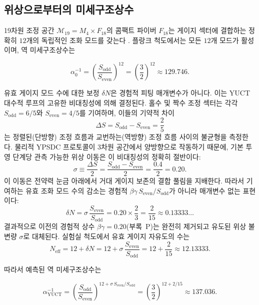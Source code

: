 \documentclass[12pt,a4paper]{article}
\theoremstyle{remark}
\begin{document}
	\subsection{위상으로부터의 미세구조상수}
	
	19차원 조정 공간 \(\mathcal{M}_{19}=M_4\times F_{18}\)의 콤팩트 파이버 \(F_{18}\)는 게이지 섹터에 결합하는 정확히 \(12\)개의 독립적인 조화 모드를 갖는다 \cite{AppendixG}. 플랑크 척도에서는 모든 \(12\)개 모드가 활성이며, 역 미세구조상수는
	
	\begin{equation}
		\alpha_0^{-1} = \left(\frac{S_{\mathrm{odd}}}{S_{\mathrm{even}}}\right)^{12}
		= \left(\frac{3}{2}\right)^{12} \approx 129.746 .
	\end{equation}
	
	유효 게이지 모드 수에 대한 보정 \(\delta N\)은 경험적 피팅 매개변수가 아니다. 이는 YUCT 대수적 루프의 고유한 비대칭성에 의해 결정된다. 홀수 및 짝수 조정 섹터는 각각 \(S_{\mathrm{odd}} = 6/5\)와 \(S_{\mathrm{even}} = 4/5\)를 기여하며, 이들의 기약적 차이
	\[
	\Delta S = S_{\mathrm{odd}} - S_{\mathrm{even}} = \frac{2}{5}
	\]
	는 정렬된(단방향) 조정 흐름과 교번하는(역방향) 조정 흐름 사이의 불균형을 측정한다. 물리적 YPSDC 프로토콜이 3차원 공간에서 양방향으로 작동하기 때문에, 기본 투영 단계당 관측 가능한 위상 이동은 이 비대칭성의 정확히 절반이다:
	\[
	\sigma \equiv \frac{\Delta S}{2} = \frac{S_{\mathrm{odd}} - S_{\mathrm{even}}}{2}
	= \frac{0.4}{2} = 0.20.
	\]
	이 이동은 전약력 눈금 아래에서 거대 게이지 보존의 결합 풀림을 지배한다. 따라서 기여하는 유효 조화 모드 수의 감소는 경험적 \(\beta\gamma\,S_{\mathrm{even}}/S_{\mathrm{odd}}\)가 아니라 매개변수 없는 표현이다:
	\[
	\delta N = \sigma \, \frac{S_{\mathrm{even}}}{S_{\mathrm{odd}}}
	= 0.20 \times \frac{2}{3}
	= \frac{2}{15} \approx 0.13333\ldots
	\]
	결과적으로 이전의 경험적 상수 \(\beta\gamma = 0.20\)(부록~P)는 완전히 제거되고 유도된 위상 불변량 \(\sigma\)로 대체된다. 실험실 척도에서 유효 게이지 자유도의 수는
	\[
	N_{\mathrm{eff}} = 12 + \delta N = 12 + \sigma\,\frac{S_{\mathrm{even}}}{S_{\mathrm{odd}}}
	= 12 + \frac{2}{15} \approx 12.13333 .
	\]
	
	따라서 예측된 역 미세구조상수는
	
	\begin{equation}
		\boxed{\alpha^{-1}_{\mathrm{YUCT}} =
			\left(\frac{S_{\mathrm{odd}}}{S_{\mathrm{even}}}\right)^{12 + \sigma\,S_{\mathrm{even}}/S_{\mathrm{odd}}}
			= \left(\frac{3}{2}\right)^{12 + 2/15}
			\approx 137.036 } .
		\label{eq:alpha-yuct}
	\end{equation}
	
\end{document}
